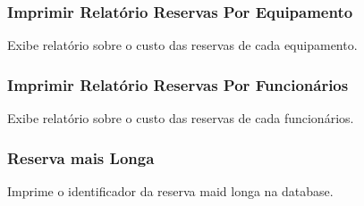 \documentclass[11pt]{article}
\begin{document}
\subsubsection{Imprimir Relatório Reservas Por Equipamento}
\label{sec:org9ba46de}
Exibe relatório sobre o custo das reservas de cada equipamento.
\subsubsection{Imprimir Relatório Reservas Por Funcionários}
\label{sec:org795b4cb}
Exibe relatório sobre o custo das reservas de cada funcionários.
\subsubsection{Reserva mais Longa}
\label{sec:org45c1ce1}
Imprime o identificador da reserva maid longa na database. 
\end{document}
